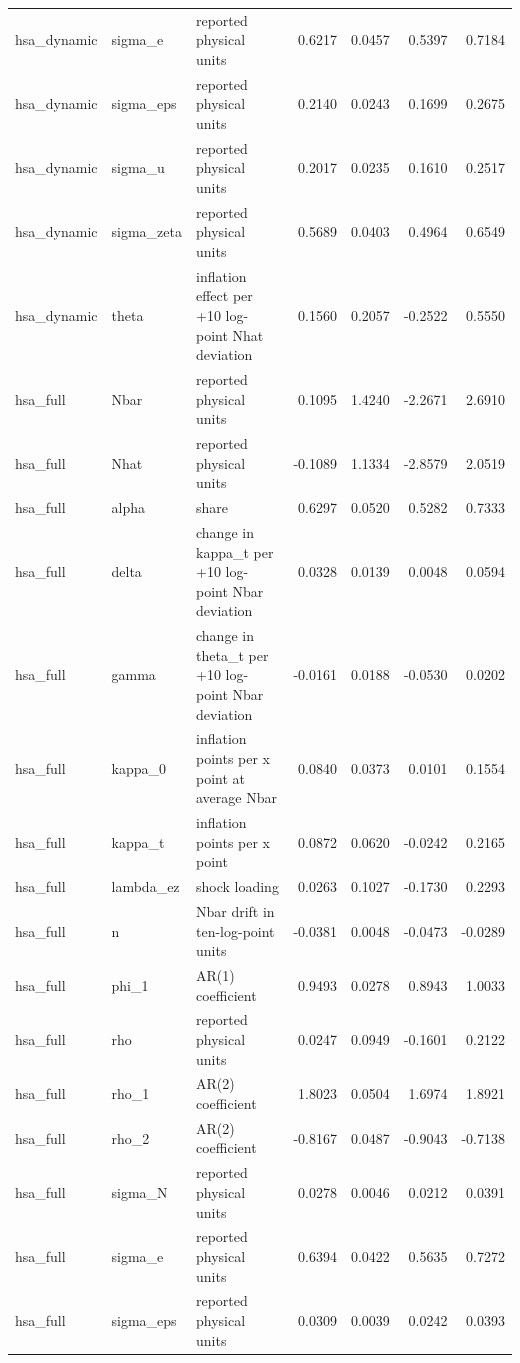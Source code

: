 \begin{tabular}{lllrrrr}
hsa\_dynamic & sigma\_e & reported physical units & 0.6217 & 0.0457 & 0.5397 & 0.7184 \\
hsa\_dynamic & sigma\_eps & reported physical units & 0.2140 & 0.0243 & 0.1699 & 0.2675 \\
hsa\_dynamic & sigma\_u & reported physical units & 0.2017 & 0.0235 & 0.1610 & 0.2517 \\
hsa\_dynamic & sigma\_zeta & reported physical units & 0.5689 & 0.0403 & 0.4964 & 0.6549 \\
hsa\_dynamic & theta & inflation effect per +10 log-point Nhat deviation & 0.1560 & 0.2057 & -0.2522 & 0.5550 \\
hsa\_full & Nbar & reported physical units & 0.1095 & 1.4240 & -2.2671 & 2.6910 \\
hsa\_full & Nhat & reported physical units & -0.1089 & 1.1334 & -2.8579 & 2.0519 \\
hsa\_full & alpha & share & 0.6297 & 0.0520 & 0.5282 & 0.7333 \\
hsa\_full & delta & change in kappa\_t per +10 log-point Nbar deviation & 0.0328 & 0.0139 & 0.0048 & 0.0594 \\
hsa\_full & gamma & change in theta\_t per +10 log-point Nbar deviation & -0.0161 & 0.0188 & -0.0530 & 0.0202 \\
hsa\_full & kappa\_0 & inflation points per x point at average Nbar & 0.0840 & 0.0373 & 0.0101 & 0.1554 \\
hsa\_full & kappa\_t & inflation points per x point & 0.0872 & 0.0620 & -0.0242 & 0.2165 \\
hsa\_full & lambda\_ez & shock loading & 0.0263 & 0.1027 & -0.1730 & 0.2293 \\
hsa\_full & n & Nbar drift in ten-log-point units & -0.0381 & 0.0048 & -0.0473 & -0.0289 \\
hsa\_full & phi\_1 & AR(1) coefficient & 0.9493 & 0.0278 & 0.8943 & 1.0033 \\
hsa\_full & rho & reported physical units & 0.0247 & 0.0949 & -0.1601 & 0.2122 \\
hsa\_full & rho\_1 & AR(2) coefficient & 1.8023 & 0.0504 & 1.6974 & 1.8921 \\
hsa\_full & rho\_2 & AR(2) coefficient & -0.8167 & 0.0487 & -0.9043 & -0.7138 \\
hsa\_full & sigma\_N & reported physical units & 0.0278 & 0.0046 & 0.0212 & 0.0391 \\
hsa\_full & sigma\_e & reported physical units & 0.6394 & 0.0422 & 0.5635 & 0.7272 \\
hsa\_full & sigma\_eps & reported physical units & 0.0309 & 0.0039 & 0.0242 & 0.0393 \\

\end{tabular}

